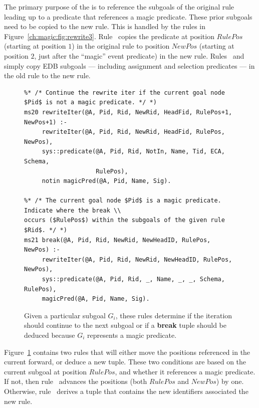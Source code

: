 The primary purpose of the  is to reference the subgoals of the
original rule leading up to a predicate that references a magic predicate.
These prior subgoals need to be copied to the new rule.  This is handled by the
rules in Figure~\ref{ch:magic:fig:rewrite3}.  Rule~ copies the
predicate at position $RulePos$ (starting at position $1$) in the original rule
to position $NewPos$ (starting at position $2$, just after the ``magic'' event
predicate) in the new rule.  Rules~ and  simply copy EDB
subgoals --- including assignment and selection predicates --- in the old rule
to the new rule.


\begin{figure}[!t]
\ssp
\centering
\begin{lstlisting}
%* /* Continue the rewrite iter if the current goal node $Pid$ is not a magic predicate. */ *)
ms20 rewriteIter(@A, Pid, Rid, NewRid, HeadFid, RulePos+1, NewPos+1) :-
     rewriteIter(@A, Pid, Rid, NewRid, HeadFid, RulePos, NewPos),
     sys::predicate(@A, Pid, Rid, NotIn, Name, Tid, ECA, Schema, 
                    RulePos),
     notin magicPred(@A, Pid, Name, Sig).

%* /* The current goal node $Pid$ is a magic predicate. Indicate where the break \\
occurs ($RulePos$) within the subgoals of the given rule $Rid$. */ *)
ms21 break(@A, Pid, Rid, NewRid, NewHeadID, RulePos, NewPos) :-
     rewriteIter(@A, Pid, Rid, NewRid, NewHeadID, RulePos, NewPos),
     sys::predicate(@A, Pid, Rid, _, Name, _, _, Schema, RulePos),
     magicPred(@A, Pid, Name, Sig).
\end{lstlisting}
\caption{\label{ch:magic:fig:rewrite4} Given a particular subgoal $G_i$, these rules determine
if the iteration should continue to the next subgoal or if a {\bf break} tuple should be
deduced because $G_i$ represents a magic predicate. }
\end{figure}

Figure~\ref{ch:magic:fig:rewrite4} contains two rules that will either move the
positions referenced in the current  forward, or deduce a new
 tuple.  These two conditions are based on the current subgoal at
position $RulePos$, and whether it references a magic predicate.  If not, then
rule~ advances the  positions (both $RulePos$ and
$NewPos$) by one.  Otherwise, rule~ derives a  tuple that
contains the new identifiers associated the new rule.

